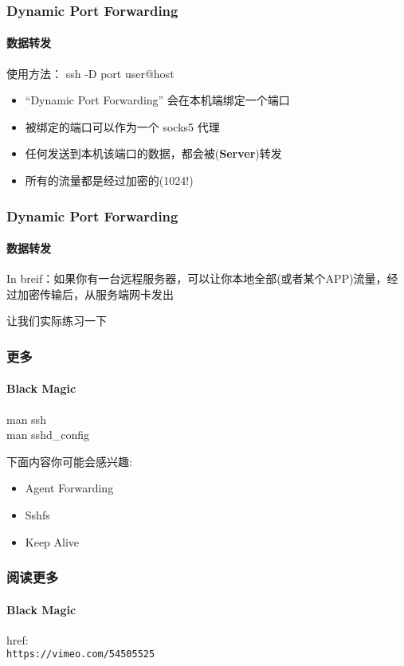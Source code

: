 \begin{frame}[fragile]
  \frametitle{Dynamic Port Forwarding}
  \framesubtitle{数据转发}

  使用方法： \vspace{\baselineskip}
  ssh -D port user@host
  \vspace{\baselineskip}

  \begin{itemize}
  \item ``Dynamic Port Forwarding'' 会在本机端绑定一个端口
  \item 被绑定的端口可以作为一个 socks5 代理
  \item  任何发送到本机该端口的数据，都会被(\textbf{Server})转发
  \item 所有的流量都是经过加密的(1024!)
  \end{itemize}

\end{frame}


\begin{frame}[fragile]
  \frametitle{Dynamic Port Forwarding}
  \framesubtitle{数据转发}
  In breif：如果你有一台远程服务器，可以让你本地全部(或者某个APP)流量，经过加密传输后，从服务端网卡发出 \\

  \pause
  \vspace{\baselineskip}

  让我们实际练习一下
  
\end{frame}


\begin{frame}[fragile]
  \frametitle{更多}
  \framesubtitle{Black Magic}
  man ssh \\
  \vspace{\baselineskip}
  man sshd\_config
  \vspace{\baselineskip}

  \pause
  下面内容你可能会感兴趣:
  \begin{itemize}
  \item Agent Forwarding
  \item Sshfs
  \item Keep Alive
  \end{itemize}
\end{frame}


\begin{frame}[fragile]
  \frametitle{阅读更多}
  \framesubtitle{Black Magic}
  href: \\
  \vspace{\baselineskip}
  \verb|https://vimeo.com/54505525|
\end{frame}
